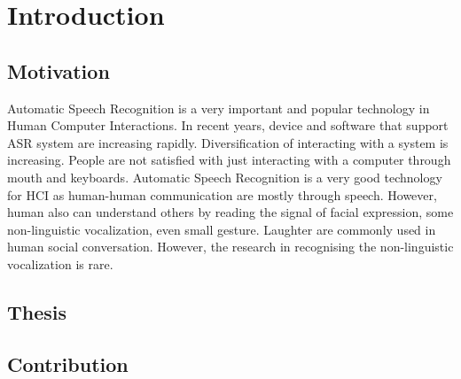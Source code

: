 \chapter{Introduction}
\section{Motivation}
Automatic Speech Recognition is a very important and popular technology in Human Computer Interactions. In recent years, device and software that support ASR system are increasing rapidly. Diversification of interacting with a system is increasing. People are not satisfied with just interacting with a computer through mouth and keyboards. Automatic Speech Recognition is a very good technology for HCI as human-human communication are mostly through speech. However, human also can understand others by reading the signal of facial expression, some non-linguistic vocalization, even small gesture.\cite{petridis2011prediction} Laughter are commonly used in human social conversation. However, the research in recognising the non-linguistic vocalization is rare.
\section{Thesis}
\section{Contribution}